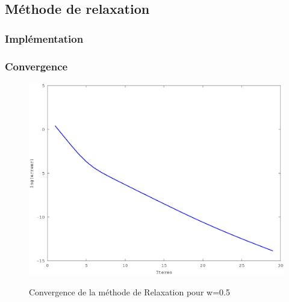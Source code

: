 \documentclass[a4paper,11pt]{article}
\begin{document}
\subsection{Méthode de relaxation}
\subsubsection{Implémentation}
\begin{multicols}{2}
  
\end{multicols}

\subsubsection{Convergence}
\begin{figure}[h!]
  \begin{centering}
    \includegraphics[scale=0.5]{../relaxation_graph}
    \label{rspro2}
    \par\end{centering}
  \caption{Convergence de la méthode de Relaxation pour w=0.5}
  \label{fig:jacobi-conv}
\end{figure}
\end{document}
